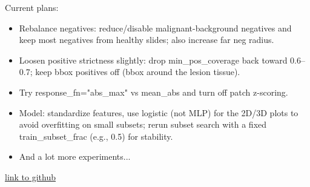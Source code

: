 \documentclass{article}
\begin{document}
Current plans:
\begin{itemize}
    \item Rebalance negatives: reduce/disable malignant-background negatives and keep most negatives from healthy slides; also increase far neg radius.
    \item Loosen positive strictness slightly: drop min\_pos\_coverage back toward 0.6–0.7; keep bbox positives off (bbox around the lesion tissue).
    \item Try response\_fn="abs\_max" vs mean\_abs and turn off patch z-scoring.
    \item Model: standardize features, use logistic (not MLP) for the 2D/3D plots to avoid overfitting on small subsets; rerun subset search with a fixed train\_subset\_frac (e.g., 0.5) for stability.
    \item And a lot more experiments...
\end{itemize}
\href{https://github.com/Masoudvahid/Kernel-Based-Cancer-Classification}{link to github}
\end{document}
